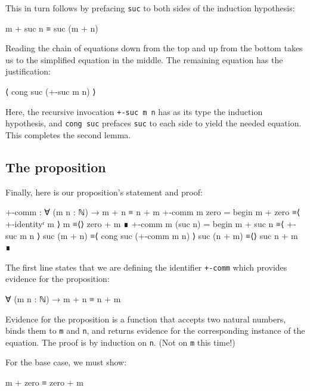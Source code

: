 This in turn follows by prefacing \texttt{suc} to both sides of the
induction hypothesis:

\begin{myDisplay}
m + suc n ≡ suc (m + n)
\end{myDisplay}

Reading the chain of equations down from the top and up from the bottom
takes us to the simplified equation in the middle. The remaining
equation has the justification:

\begin{myDisplay}
⟨ cong suc (+-suc m n) ⟩
\end{myDisplay}

Here, the recursive invocation \texttt{+-suc\ m\ n} has as its type the
induction hypothesis, and \texttt{cong\ suc} prefaces \texttt{suc} to
each side to yield the needed equation. This completes the second lemma.

\hypertarget{the-proposition}{%
\subsection{The proposition}\label{the-proposition}}

Finally, here is our proposition's statement and proof:

\begin{fence}
\begin{code}
+-comm : ∀ (m n : ℕ) → m + n ≡ n + m
+-comm m zero =
  begin
    m + zero
  ≡⟨ +-identityʳ m ⟩
    m
  ≡⟨⟩
    zero + m
  ∎
+-comm m (suc n) =
  begin
    m + suc n
  ≡⟨ +-suc m n ⟩
    suc (m + n)
  ≡⟨ cong suc (+-comm m n) ⟩
    suc (n + m)
  ≡⟨⟩
    suc n + m
  ∎
\end{code}
\end{fence}

The first line states that we are defining the identifier
\texttt{+-comm} which provides evidence for the proposition:

\begin{myDisplay}
∀ (m n : ℕ) → m + n ≡ n + m
\end{myDisplay}

Evidence for the proposition is a function that accepts two natural
numbers, binds them to \texttt{m} and \texttt{n}, and returns evidence
for the corresponding instance of the equation. The proof is by
induction on \texttt{n}. (Not on \texttt{m} this time!)

For the base case, we must show:

\begin{myDisplay}
m + zero ≡ zero + m
\end{myDisplay}

